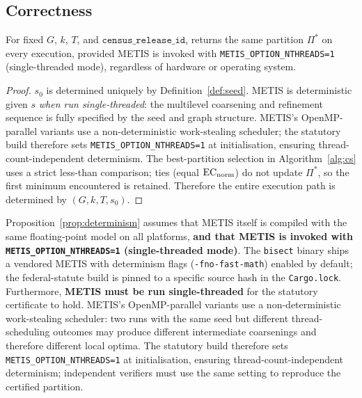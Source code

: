 \subsection{Correctness}

\begin{proposition}[Determinism]
\label{prop:determinism}
For fixed $G$, $k$, $T$, and $\mathtt{census\_release\_id}$, \cs{} returns
the same partition $\Pi^*$ on every execution, provided METIS is invoked with
\texttt{METIS\_OPTION\_NTHREADS=1} (single-threaded mode), regardless of
hardware or operating system.
\end{proposition}

\begin{proof}
$s_0$ is determined uniquely by Definition~\ref{def:seed}.
METIS is deterministic given $s$ \emph{when run single-threaded}: the
multilevel coarsening and refinement sequence is fully specified by the seed
and graph structure.
METIS's OpenMP-parallel variants use a non-deterministic work-stealing
scheduler; the statutory build therefore sets \texttt{METIS\_OPTION\_NTHREADS=1}
at initialisation, ensuring thread-count-independent determinism.
The best-partition selection in Algorithm~\ref{alg:cs} uses a strict less-than
comparison; ties (equal $\mathrm{EC}_{\mathrm{norm}}$) do not update $\Pi^*$, so the first
minimum encountered is retained.
Therefore the entire execution path is determined by $(G, k, T, s_0)$.
\end{proof}

\begin{remark}
Proposition~\ref{prop:determinism} assumes that METIS itself is compiled with
the same floating-point model on all platforms, \textbf{and that METIS is
invoked with \texttt{METIS\_OPTION\_NTHREADS=1} (single-threaded mode)}.
The \texttt{bisect} binary ships a vendored METIS with determinism flags
(\texttt{-fno-fast-math}) enabled by default; the federal-statute build is
pinned to a specific source hash in the \texttt{Cargo.lock}.
Furthermore, \textbf{METIS must be run single-threaded} for the statutory
certificate to hold.
METIS's OpenMP-parallel variants use a non-deterministic work-stealing
scheduler: two runs with the same seed but different thread-scheduling
outcomes may produce different intermediate coarsenings and therefore
different local optima.
The statutory build therefore sets \texttt{METIS\_OPTION\_NTHREADS=1} at
initialisation, ensuring thread-count-independent determinism; independent
verifiers must use the same setting to reproduce the certified partition.
\end{remark}

